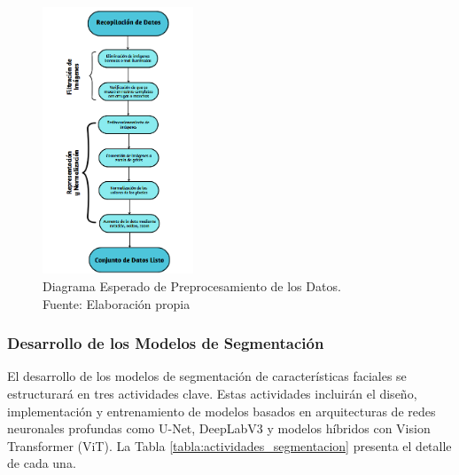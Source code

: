 \begin{figure}[H]
     \begin{center}
         \includegraphics[width=0.4\textwidth]{3/figures/Diagrama de preprocesamiento.png}
         \caption[Diagrama Esperado de Preprocesamiento de los Datos]{Diagrama Esperado de Preprocesamiento de los Datos.\\
         Fuente: Elaboración propia}
         \label{3:fig4}
     \end{center}
 \end{figure}


 \subsubsection{Desarrollo de los Modelos de Segmentación}
 El desarrollo de los modelos de segmentación de características faciales se estructurará en tres actividades clave. Estas actividades incluirán el diseño, implementación y entrenamiento de modelos basados en arquitecturas de redes neuronales profundas como U-Net, DeepLabV3 y modelos híbridos con Vision Transformer (ViT). La Tabla \ref{tabla:actividades_segmentacion} presenta el detalle de cada una.


